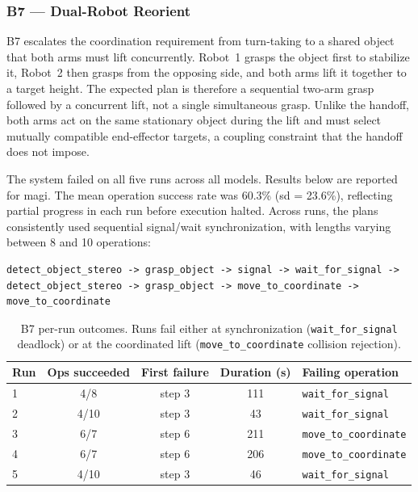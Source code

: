 \documentclass[
     12pt,
     a4paper,
     BCOR=10mm,
     DIV=14,
     listof=totoc,
     bibliography=totoc,
     parskip,
     twoside,
     headsepline
     ]{scrreprt}
\begin{document}
\subsubsection{B7 --- Dual-Robot Reorient}
B7 escalates the coordination requirement from turn-taking to a shared object that both arms must lift concurrently. Robot~1 grasps the object first to stabilize it, Robot~2 then grasps from the opposing side, and both arms lift it together to a target height. The expected plan is therefore a sequential two-arm grasp followed by a concurrent lift, not a single simultaneous grasp. Unlike the handoff, both arms act on the same stationary object during the lift and must select mutually compatible end-effector targets, a coupling constraint that the handoff does not impose.

The system failed on all five runs across all models. Results below are reported for \gls{magi}. The mean operation success rate was 60.3\% (\gls{sd} = 23.6\%), reflecting partial progress in each run before execution halted. Across runs, the plans consistently used sequential signal/wait synchronization, with lengths varying between 8 and 10 operations:

\begin{lstlisting}
detect_object_stereo -> grasp_object -> signal -> wait_for_signal -> detect_object_stereo -> grasp_object -> move_to_coordinate -> move_to_coordinate
\end{lstlisting}

\begin{table}[ht]
	\centering
	\begin{tabular}{lcccl}
		\textbf{Run}          & \textbf{Ops succeeded}     & \textbf{First failure} &
		\textbf{Duration (s)} & \textbf{Failing operation}                                                                \\
		\hline
		1                     & 4/8                        & step 3                 & 111 & \texttt{wait\_for\_signal}    \\
		2                     & 4/10                       & step 3                 & 43  & \texttt{wait\_for\_signal}    \\
		3                     & 6/7                        & step 6                 & 211 & \texttt{move\_to\_coordinate} \\
		4                     & 6/7                        & step 6                 & 206 & \texttt{move\_to\_coordinate} \\
		5                     & 4/10                       & step 3                 & 46  & \texttt{wait\_for\_signal}    \\
		\hline
	\end{tabular}
	\caption{B7 per-run outcomes. Runs fail either at synchronization (\texttt{wait\_for\_signal} deadlock) or at the coordinated lift (\texttt{move\_to\_coordinate} collision rejection).}
	\label{tab:b7-outcomes}
\end{table}
\end{document}
